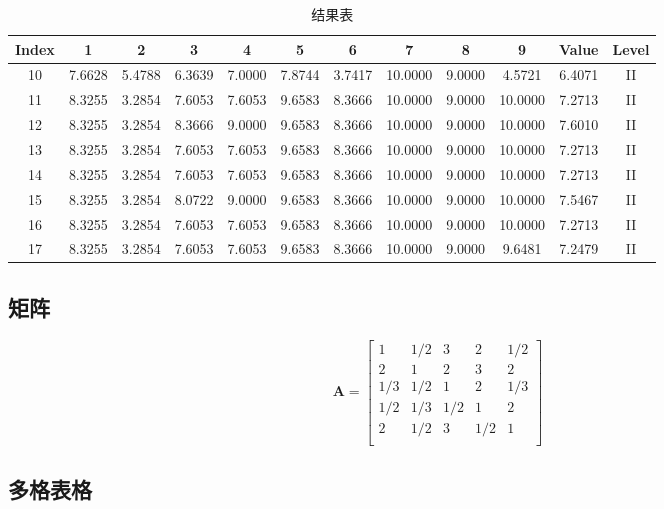 \documentclass[14pt,a4paper,UTF8,twoside]{article}
\begin{document}
\begin{table}[H]
	\centering
	\begin{tabular}{c|ccccccccc|c|c}
	\toprule
	\textbf{Index} &\textbf{1} & \textbf{2} & \textbf{3} & \textbf{4} & \textbf{5} & \textbf{6} & \textbf{7} & \textbf{8} & \textbf{9} & \textbf{Value} & \textbf{Level} \\
	\midrule
	10 & 7.6628 & 5.4788 & 6.3639 & 7.0000 & 7.8744 & 3.7417 & 10.0000 & 9.0000 & 4.5721  & 6.4071 & II \\
	11 & 8.3255 & 3.2854 & 7.6053 & 7.6053 & 9.6583 & 8.3666 & 10.0000 & 9.0000 & 10.0000 & 7.2713 & II \\
	12 & 8.3255 & 3.2854 & 8.3666 & 9.0000 & 9.6583 & 8.3666 & 10.0000 & 9.0000 & 10.0000 & 7.6010 & II \\
	13 & 8.3255 & 3.2854 & 7.6053 & 7.6053 & 9.6583 & 8.3666 & 10.0000 & 9.0000 & 10.0000 & 7.2713 & II \\
	14 & 8.3255 & 3.2854 & 7.6053 & 7.6053 & 9.6583 & 8.3666 & 10.0000 & 9.0000 & 10.0000 & 7.2713 & II \\
	15 & 8.3255 & 3.2854 & 8.0722 & 9.0000 & 9.6583 & 8.3666 & 10.0000 & 9.0000 & 10.0000 & 7.5467 & II \\
	16 & 8.3255 & 3.2854 & 7.6053 & 7.6053 & 9.6583 & 8.3666 & 10.0000 & 9.0000 & 10.0000 & 7.2713 & II \\
	17 & 8.3255 & 3.2854 & 7.6053 & 7.6053 & 9.6583 & 8.3666 & 10.0000 & 9.0000 & 9.6481  & 7.2479 & II \\
	\bottomrule
	\end{tabular}
	\caption{结果表}
\end{table}

\subsection{矩阵}

\[
\mathbf{A} = 
\begin{bmatrix}
    1 & 1/2 & 3 & 2 & 1/2 \\
    2 & 1 & 2 & 3 & 2 \\
    1/3 & 1/2 & 1 & 2 & 1/3 \\
    1/2 & 1/3 & 1/2 & 1 & 2 \\
    2 & 1/2 & 3 & 1/2 & 1 \\
\end{bmatrix}
\]

\subsection{多格表格}
\end{document}
